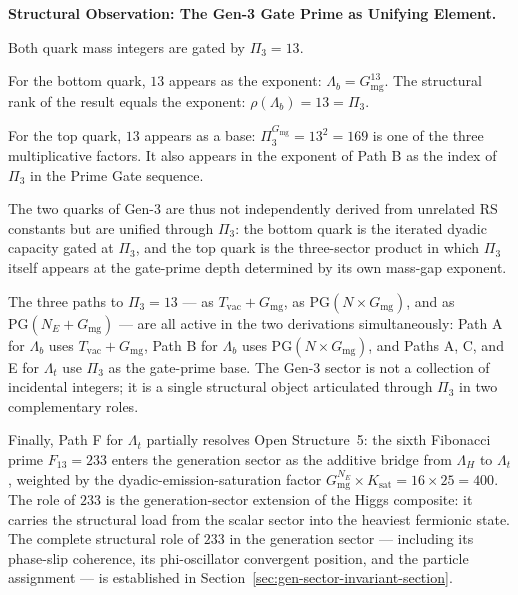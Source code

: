 \documentclass[11pt, letterpaper]{article}
\theoremstyle{definition}
\theoremstyle{plain}
\begin{document}
\begin{observebox}
\textbf{Structural Observation: The Gen-3 Gate Prime as Unifying Element.}

Both quark mass integers are gated by $\Pi_3 = 13$.

For the bottom quark, $13$ appears as the exponent: $\Lambda_b = G_\mathrm{mg}^{13}$.
The structural rank of the result equals the exponent: $\rho(\Lambda_b) = 13 = \Pi_3$.

For the top quark, $13$ appears as a base: $\Pi_3^{G_\mathrm{mg}} = 13^2 = 169$ is
one of the three multiplicative factors. It also appears in the exponent of Path B as
the index of $\Pi_3$ in the Prime Gate sequence.

The two quarks of Gen-3 are thus not independently derived from unrelated RS constants
but are unified through $\Pi_3$: the bottom quark is the iterated dyadic capacity
gated at $\Pi_3$, and the top quark is the three-sector product in which $\Pi_3$ itself
appears at the gate-prime depth determined by its own mass-gap exponent.

The three paths to $\Pi_3 = 13$ — as $T_\mathrm{vac} + G_\mathrm{mg}$, as
$\mathrm{PG}(N \times G_\mathrm{mg})$, and as $\mathrm{PG}(N_E + G_\mathrm{mg})$ — are
all active in the two derivations simultaneously: Path A for $\Lambda_b$ uses
$T_\mathrm{vac} + G_\mathrm{mg}$, Path B for $\Lambda_b$ uses
$\mathrm{PG}(N \times G_\mathrm{mg})$, and Paths A, C, and E for $\Lambda_t$ use
$\Pi_3$ as the gate-prime base. The Gen-3 sector is not a collection of incidental
integers; it is a single structural object articulated through $\Pi_3$ in two complementary
roles.

Finally, Path F for $\Lambda_t$ partially resolves Open Structure~5: the sixth Fibonacci
prime $F_{13} = 233$ enters the generation sector as the additive bridge from $\Lambda_H$
to $\Lambda_t$, weighted by the dyadic-emission-saturation factor
$G_\mathrm{mg}^{N_E} \times K_\mathrm{sat} = 16 \times 25 = 400$. The role of $233$
is the generation-sector extension of the Higgs composite: it carries the structural load
from the scalar sector into the heaviest fermionic state. The complete structural role of
$233$ in the generation sector — including its phase-slip coherence, its phi-oscillator
convergent position, and the particle assignment — is established in
Section~\ref{sec:gen-sector-invariant-section}.
\end{observebox}
\end{document}
